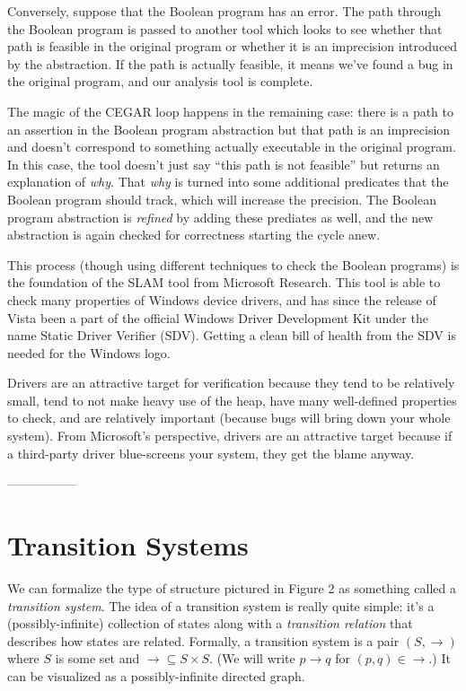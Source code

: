\documentclass{article}
\begin{document}
Conversely, suppose that the Boolean program has an error. The path
through the Boolean program is passed to another tool which looks to
see whether that path is feasible in the original program or whether
it is an imprecision introduced by the abstraction. If the path is
actually feasible, it means we've found a bug in the original program,
and our analysis tool is complete.

The magic of the CEGAR loop happens in the remaining case: there is a
path to an assertion in the Boolean program abstraction but that path
is an imprecision and doesn't correspond to something actually
executable in the original program. In this case, the tool doesn't
just say ``this path is not feasible'' but returns an explanation of
\emph{why}. That \emph{why} is turned into some additional predicates
that the Boolean program should track, which will increase the
precision. The Boolean program abstraction is \emph{refined} by adding
these prediates as well, and the new abstraction is again checked for
correctness starting the cycle anew.

This process (though using different techniques to check the Boolean
programs) is the foundation of the SLAM tool from Microsoft
Research. This tool is able to check many properties of Windows device
drivers, and has since the release of Vista been a part of the
official Windows Driver Development Kit under the name Static Driver
Verifier (SDV). Getting a clean bill of health from the SDV is needed
for the Windows logo. 

Drivers are an attractive target for verification because they tend to
be relatively small, tend to not make heavy use of the heap, have many
well-defined properties to check, and are relatively important
(because bugs will bring down your whole system). From Microsoft's
perspective, drivers are an attractive target because if a third-party
driver blue-screens your system, they get the blame anyway.

-----------------


\section{Transition Systems}

We can formalize the type of structure pictured in Figure 2 as
something called a \emph{transition system}. The idea of a transition
system is really quite simple: it's a (possibly-infinite) collection
of states along with a \emph{transition relation} that describes how
states are related. Formally, a transition system is a pair $(S,
\rightarrow)$ where $S$ is some set and $\rightarrow \subseteq S
\times S$. (We will write $p \rightarrow q$ for $(p, q) \in
\rightarrow$.) It can be visualized as a possibly-infinite directed
graph.
\end{document}
